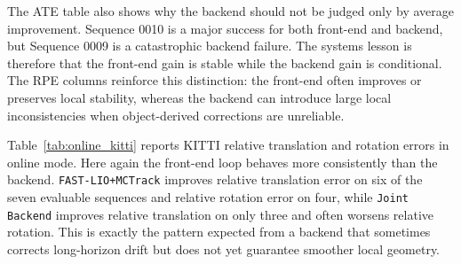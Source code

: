 \documentclass[a4paper,12pt]{article}
\begin{document}
\begin{table}[H]
    \centering
    \caption{Summary of online ATE/RPE results. Improvement percentages are computed relative to \texttt{Baseline}; positive values indicate lower error.}
    \label{tab:online_ate}
\end{table}

The ATE table also shows why the backend should not be judged only by average improvement. Sequence 0010 is a major success for both front-end and backend, but Sequence 0009 is a catastrophic backend failure. The systems lesson is therefore that the front-end gain is stable while the backend gain is conditional. The RPE columns reinforce this distinction: the front-end often improves or preserves local stability, whereas the backend can introduce large local inconsistencies when object-derived corrections are unreliable.

Table~\ref{tab:online_kitti} reports KITTI relative translation and rotation errors in online mode. Here again the front-end loop behaves more consistently than the backend. \texttt{FAST-LIO+MCTrack} improves relative translation error on six of the seven evaluable sequences and relative rotation error on four, while \texttt{Joint Backend} improves relative translation on only three and often worsens relative rotation. This is exactly the pattern expected from a backend that sometimes corrects long-horizon drift but does not yet guarantee smoother local geometry.
\end{document}
